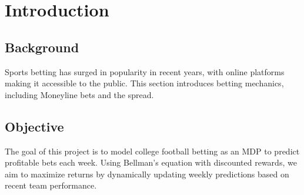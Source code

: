 \section{Introduction}
    \subsection{Background}
    Sports betting has surged in popularity in recent years, with online platforms making it accessible to the public. This section introduces betting mechanics, including Moneyline bets and the spread.

    \subsection{Objective}
    The goal of this project is to model college football betting as an MDP to predict profitable bets each week. Using Bellman’s equation with discounted rewards, we aim to maximize returns by dynamically updating weekly predictions based on recent team performance.